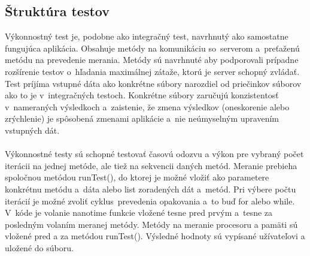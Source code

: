 \documentclass[
  digital, %
  table,   %
oneside,
  nolof,     %
  nolot,     %
]{fithesis3}
\begin{document}
\subsection{Štruktúra testov}
Výkonnostný test je, podobne ako integračný test, navrhnutý ako samostatne fungujúca aplikácia. Obsahuje metódy na komunikáciu so~serverom a~preťaženú metódu na prevedenie merania. Metódy sú navrhnuté aby podporovali prípadne rozšírenie testov o~hľadania maximálnej zátaže, ktorú je server schopný zvládať. Test príjíma vstupné dáta ako konkrétne súbory narozdiel od priečinkov súborov ako to je v~integračných testoch. Konkrétne súbory zaručujú konzistentosť v~nameraných výsledkoch a~zaistenie, že zmena výsledkov (oneskorenie alebo zrýchlenie) je spôsobená zmenami aplikácie a~nie neúmyselným upravením vstupných dát. \paragraph{}

Výkonnostné testy sú schopné testovať časovú odozvu a výkon pre vybraný počet iterácii na jednej metóde, ale tiež na sekvencii daných metód. Meranie prebieha spoločnou metódou runTest(), do ktorej je možné vložiť ako parametere konkrétnu metódu a~dáta alebo list zoradených dát a~metód. Pri výbere počtu iterácií je možné zvoliť cyklus~prevedenia opakovania a~to buď for alebo while.
V~kóde je  volanie nanotime funkcie vložené tesne pred prvým a~tesne za posledným volaním meranej metódy. Metódy na meranie procesoru a pamäti sú vložené pred a za metódou runTest(). Výsledné hodnoty sú vypísané užívateľovi a uložené do súboru. 
\end{document}
